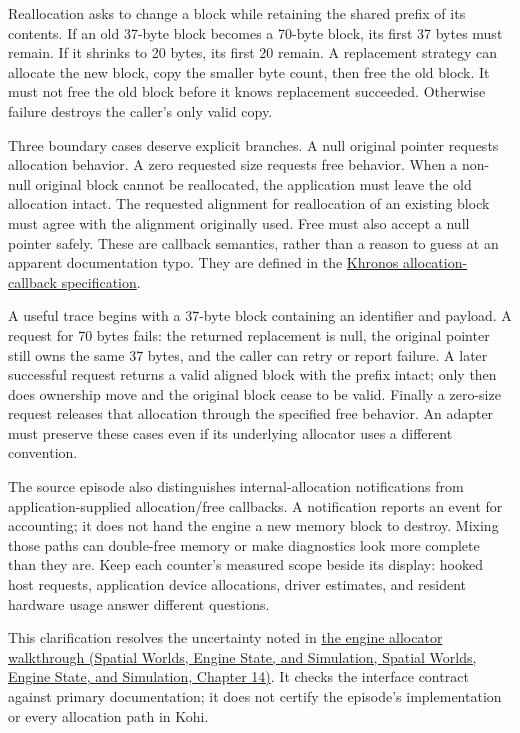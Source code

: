Reallocation asks to change a block while retaining the shared prefix of its contents. If an old 37-byte block becomes a 70-byte block, its first 37 bytes must remain. If it shrinks to 20 bytes, its first 20 remain. A replacement strategy can allocate the new block, copy the smaller byte count, then free the old block. It must not free the old block before it knows replacement succeeded. Otherwise failure destroys the caller's only valid copy.

Three boundary cases deserve explicit branches. A null original pointer requests allocation behavior. A zero requested size requests free behavior. When a non-null original block cannot be reallocated, the application must leave the old allocation intact. The requested alignment for reallocation of an existing block must agree with the alignment originally used. Free must also accept a null pointer safely. These are callback semantics, rather than a reason to guess at an apparent documentation typo. They are defined in the \href{https://docs.vulkan.org/spec/latest/chapters/memory.html}{Khronos allocation-callback specification}.

A useful trace begins with a 37-byte block containing an identifier and payload. A request for 70 bytes fails: the returned replacement is null, the original pointer still owns the same 37 bytes, and the caller can retry or report failure. A later successful request returns a valid aligned block with the prefix intact; only then does ownership move and the original block cease to be valid. Finally a zero-size request releases that allocation through the specified free behavior. An adapter must preserve these cases even if its underlying allocator uses a different convention.

The source episode also distinguishes internal-allocation notifications from application-supplied allocation/free callbacks. A notification reports an event for accounting; it does not hand the engine a new memory block to destroy. Mixing those paths can double-free memory or make diagnostics look more complete than they are. Keep each counter's measured scope beside its display: hooked host requests, application device allocations, driver estimates, and resident hardware usage answer different questions.

This clarification resolves the uncertainty noted in \href{../05-Spatial-Worlds-Engine-State-and-Simulation/main.pdf\#nameddest=05-engine-i-ch014-bridge-vulkan-allocation-callbacks-to-an-engine-allocator}{the engine allocator walkthrough (Spatial Worlds, Engine State, and Simulation, Spatial Worlds, Engine State, and Simulation, Chapter 14)}. It checks the interface contract against primary documentation; it does not certify the episode's implementation or every allocation path in Kohi.

